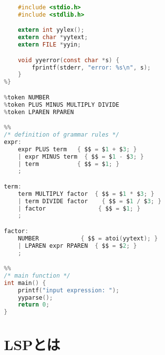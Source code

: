 \documentclass[fontsize=9bp,twocolumn,column_gap=2.36zw,a4paper,report]{jlreq}
\begin{document}
\begin{lstlisting}[caption=Bisonの記述例,label=code:bison,language=c]
%{
    #include <stdio.h>
    #include <stdlib.h>

    extern int yylex();
    extern char *yytext;
    extern FILE *yyin;

    void yyerror(const char *s) {
        fprintf(stderr, "error: %s\n", s);
    }
%}

%token NUMBER
%token PLUS MINUS MULTIPLY DIVIDE
%token LPAREN RPAREN

%%
/* definition of grammar rules */
expr:
    expr PLUS term   { $$ = $1 + $3; }
    | expr MINUS term  { $$ = $1 - $3; }
    | term           { $$ = $1; }
    ;

term:
    term MULTIPLY factor  { $$ = $1 * $3; }
    | term DIVIDE factor    { $$ = $1 / $3; }
    | factor               { $$ = $1; }
    ;

factor:
    NUMBER            { $$ = atoi(yytext); }
    | LPAREN expr RPAREN  { $$ = $2; }
    ;

%%
/* main function */
int main() {
    printf("input expression: ");
    yyparse();
    return 0;
}
\end{lstlisting}

\begin{figure}[h]
\end{figure}

\chapter{LSPとは}
\end{document}
